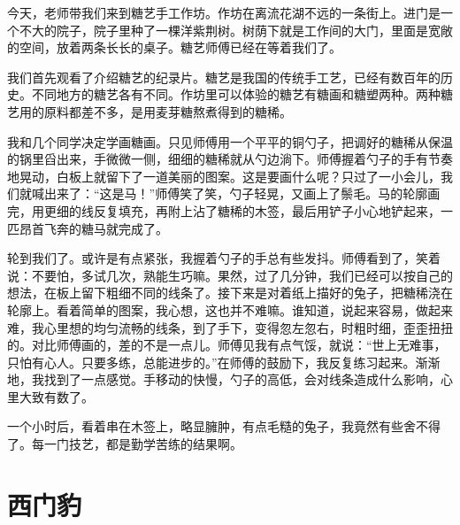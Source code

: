 \documentclass[12pt,UTF-8,openany]{ctexbook}
\begin{document}
\begin{large}
    
    今天，老师带我们来到糖艺手工作坊。作坊在离流花湖不远的一条街上。进门是一个不大的院子，院子里种了一棵洋紫荆树。树荫下就是工作间的大门，里面是宽敞的空间，放着两条长长的桌子。糖艺师傅已经在等着我们了。
    
    我们首先观看了介绍糖艺的纪录片。糖艺是我国的传统手工艺，已经有数百年的历史。不同地方的糖艺各有不同。作坊里可以体验的糖艺有糖画和糖塑两种。两种糖艺用的原料都差不多，是用麦芽糖熬煮得到的糖稀。
    
    我和几个同学决定学画糖画。只见师傅用一个平平的铜勺子，把调好的糖稀从保温的锅里舀出来，手微微一侧，细细的糖稀就从勺边淌下。师傅握着勺子的手有节奏地晃动，白板上就留下了一道美丽的图案。这是要画什么呢？只过了一小会儿，我们就喊出来了：“这是马！”师傅笑了笑，勺子轻晃，又画上了鬃毛。马的轮廓画完，用更细的线反复填充，再附上沾了糖稀的木签，最后用铲子小心地铲起来，一匹昂首飞奔的糖马就完成了。
    
    轮到我们了。或许是有点紧张，我握着勺子的手总有些发抖。师傅看到了，笑着说：不要怕，多试几次，熟能生巧嘛。果然，过了几分钟，我们已经可以按自己的想法，在板上留下粗细不同的线条了。接下来是对着纸上描好的兔子，把糖稀浇在轮廓上。看着简单的图案，我心想，这也并不难嘛。谁知道，说起来容易，做起来难，我心里想的均匀流畅的线条，到了手下，变得忽左忽右，时粗时细，歪歪扭扭的。对比师傅画的，差的不是一点儿。师傅见我有点气馁，就说：“世上无难事，只怕有心人。只要多练，总能进步的。”在师傅的鼓励下，我反复练习起来。渐渐地，我找到了一点感觉。手移动的快慢，勺子的高低，会对线条造成什么影响，心里大致有数了。
    
    一个小时后，看着串在木签上，略显臃肿，有点毛糙的兔子，我竟然有些舍不得了。每一门技艺，都是勤学苦练的结果啊。
    
\end{large}



\chapter{西门豹}
\end{document}
